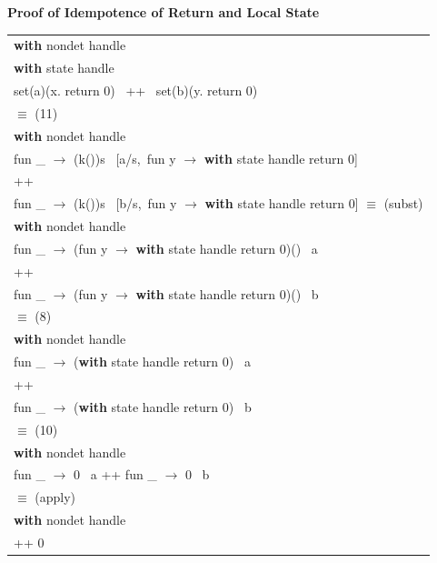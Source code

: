 \documentclass[logo,bsc,singlespacing,parskip]{infthesis}
\begin{document}
\vspace{1em}
{\large{\textbf{Proof of Idempotence of Return and Local State}}}

\normalsize



\begin{longtable}{@{}l@{}}
\textbf{with } nondet handle \\
\quad \textbf{with } state handle \\
\quad\quad set(a)(x. return 0) \, ++ \, set(b)(y. return 0) \\

\quad$\equiv$ (11) \\

\textbf{with } nondet handle \\
\quad fun \_ $\rightarrow$ (k())s \ [a/s,\ fun y $\rightarrow$ \textbf{with } state handle return 0]\\
\quad\quad ++ \\
\quad fun \_ $\rightarrow$ (k())s \ [b/s,\ fun y $\rightarrow$ \textbf{with } state handle return 0] 
\quad$\equiv$ (subst) \\
\textbf{with } nondet handle \\
\quad fun \_ $\rightarrow$ (fun y $\rightarrow$ \textbf{with } state handle return 0)() \ a \\
\quad\quad ++ \\
\quad fun \_ $\rightarrow$ (fun y $\rightarrow$ \textbf{with } state handle return 0)() \ b \\
\quad$\equiv$ (8) \\
\textbf{with } nondet handle \\
\quad fun \_ $\rightarrow$ (\textbf{with } state handle return 0) \ a \\
\quad ++ \\
\quad fun \_ $\rightarrow$ (\textbf{with } state handle return 0) \ b \\
\quad$\equiv$ (10) \\
\textbf{with } nondet handle \\
\quad fun \_ $\rightarrow$ 0 \ a \quad ++ \quad fun \_ $\rightarrow$ 0 \ b \\
\quad$\equiv$ (apply) \\
\textbf{with } nondet handle \\
\quad 0 ++ 0 \\
\end{longtable}
\end{document}
